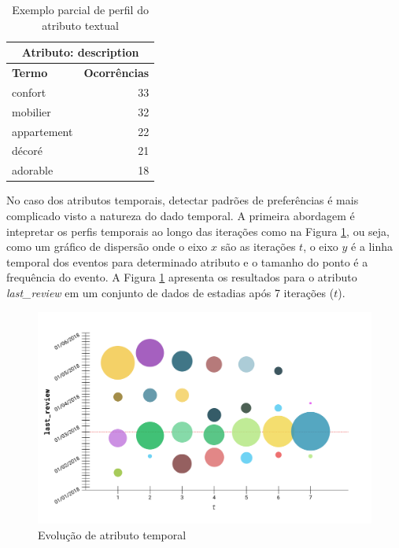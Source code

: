 \begin{table}[!h]
	\centering
	\begin{tabular}{|l|r|}
	\hline
	\multicolumn{2}{|c|}{\textbf{Atributo: description}} \\ \hline
	\textbf{Termo}     & \textbf{Ocorrências}     \\ \hline
	confort             & 33                       \\ \hline
	mobilier            & 32                       \\ \hline
	appartement             & 22                       \\ \hline
	décoré               & 21                       \\ \hline
	adorable               & 18                       \\ \hline
	\end{tabular}
	\caption{Exemplo parcial de perfil do atributo textual}
	\label{table:perfil-textual-2}
\end{table}

No caso dos atributos temporais, detectar padrões de preferências é mais complicado visto a natureza do dado temporal. A primeira abordagem é intepretar os perfis temporais ao longo das iterações como na Figura \ref{fig:analise-atributo-temporal}, ou seja, como um gráfico de dispersão onde o eixo $x$ são as iterações $t$, o eixo $y$ é a linha temporal dos eventos para determinado atributo e o tamanho do ponto é a frequência do evento. A Figura \ref{fig:analise-atributo-temporal} apresenta os resultados para o atributo {\em last\_review} em um conjunto de dados de estadias após 7 iterações ($t$).

\begin{figure}[!h]
	\centering
	\includegraphics[width=\textwidth]{imagens/analise-atributo-temporal}
	\caption{Evolução de atributo temporal}
	\label{fig:analise-atributo-temporal}
\end{figure}

